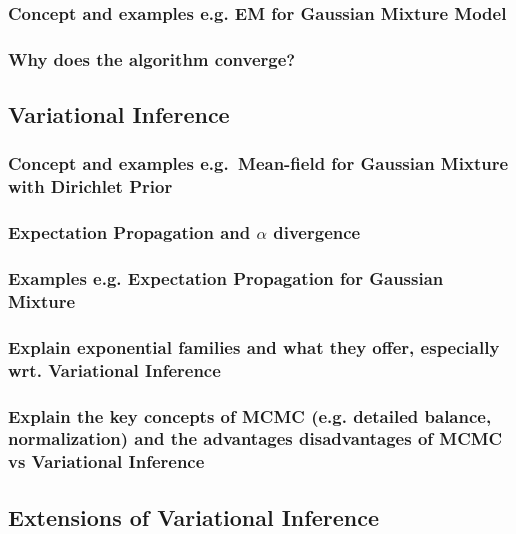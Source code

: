 \documentclass{article}
\begin{document}
\subsubsection{Concept and examples e.g. EM for Gaussian Mixture Model}


\subsubsection{Why does the algorithm converge?}









\subsection{Variational Inference}


\subsubsection{Concept and examples e.g.~Mean-field for Gaussian Mixture with Dirichlet Prior}

\subsubsection{Expectation Propagation and $\alpha$ divergence}


\subsubsection{Examples e.g. Expectation Propagation for Gaussian Mixture}


\subsubsection{Explain exponential families and what they offer, especially wrt. Variational Inference}


\subsubsection{Explain the key concepts of MCMC (e.g. detailed balance, normalization) and the advantages disadvantages of MCMC vs Variational Inference}









\subsection{Extensions of Variational Inference}
\end{document}
